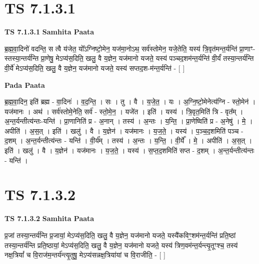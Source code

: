\documentclass[17pt]{extarticle}
\begin{document}
\section*{ TS 7.1.3.1 }

\textbf{TS 7.1.3.1 } \newline
\textbf{Samhita Paata} \newline

ब्र॒ह्म॒वा॒दिनो॑ वदन्ति॒ स त्वै य॑जेत॒ यो᳚ऽग्निष्टो॒मेन॒ यज॑मा॒नोऽथ॒ सर्व॑स्तोमेन॒ यजे॒तेति॒ यस्य॑ त्रि॒वृत॑मन्त॒र्यन्ति॑ प्रा॒णाꣳ-स्तस्या॒न्तर्य॑न्ति प्रा॒णेषु॒ मेऽप्य॑स॒दिति॒ खलु॒ वै य॒ज्ञेन॒ यज॑मानो यजते॒ यस्य॑ पञ्चद॒शम॑न्त॒र्यन्ति॑ वी॒र्यं॑ तस्या॒न्तर्य॑न्ति वी॒र्ये॑ मेऽप्य॑स॒दिति॒ खलु॒ वै य॒ज्ञेन॒ यज॑मानो यजते॒ यस्य॑ सप्तद॒श-म॑न्त॒र्यन्ति॑ - [  ] \newline

\textbf{Pada Paata} \newline

ब्र॒ह्म॒वा॒दिन॒ इति॑ ब्रह्म - वा॒दिनः॑ । व॒द॒न्ति॒ । सः । तु । वै । य॒जे॒त॒ । यः । अ॒ग्नि॒ष्टो॒मेनेत्य॑ग्नि - स्तो॒मेन॑ । यज॑मानः । अथ॑ । सर्व॑स्तोमे॒नेति॒ सर्व॑ - स्तो॒मे॒न॒ । यजे॑त । इति॑ । यस्य॑ । त्रि॒वृत॒मिति॑ त्रि - वृत᳚म् । अ॒न्त॒र्यन्तीत्य॑न्तः-यन्ति॑ । प्रा॒णानिति॑ प्र - अ॒नान् । तस्य॑ । अ॒न्तः । य॒न्ति॒ । प्रा॒णेष्विति॑ प्र - अ॒नेषु॑ । मे॒ । अपीति॑ । अ॒स॒त् । इति॑ । खलु॑ । वै । य॒ज्ञेन॑ । यज॑मानः । य॒ज॒ते॒ । यस्य॑ । प॒ञ्च॒द॒शमिति॑ पञ्च - द॒शम् । अ॒न्त॒र्यन्तीत्य॑न्तः - यन्ति॑ । वी॒र्य᳚म् । तस्य॑ । अ॒न्तः । य॒न्ति॒ । वी॒र्ये᳚ । मे॒ । अपीति॑ । अ॒स॒त् । इति॑ । खलु॑ । वै । य॒ज्ञेन॑ । यज॑मानः । य॒ज॒ते॒ । यस्य॑ । स॒प्त॒द॒शमिति॑ सप्त - द॒शम् । अ॒न्त॒र्यन्तीत्य॑न्तः - यन्ति॑ ।  \newline




\section*{ TS 7.1.3.2 }

\textbf{TS 7.1.3.2 } \newline
\textbf{Samhita Paata} \newline

प्र॒जां तस्या॒न्तर्य॑न्ति प्र॒जायां॒ मेऽप्य॑स॒दिति॒ खलु॒ वै य॒ज्ञेन॒ यज॑मानो यजते॒ यस्यै॑कविꣳ॒॒शम॑न्त॒र्यन्ति॑ प्रति॒ष्ठां तस्या॒न्तर्य॑न्ति प्रति॒ष्ठायां॒ मेऽप्य॑स॒दिति॒ खलु॒ वै य॒ज्ञेन॒ यज॑मानो यजते॒ यस्य॑ त्रिण॒वम॑न्त॒र्यन्त्यृ॒तूꣳश्च॒ तस्य॑ नक्ष॒त्रियां᳚ च वि॒राज॑म॒न्तर्य॑न्त्यृ॒तुषु॒ मेऽप्य॑सन्नक्ष॒त्रिया॑यां च वि॒राजीति॒ - [  ] \newline
\end{document}
